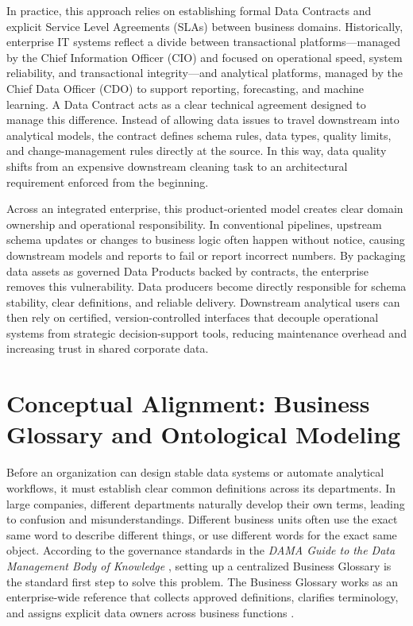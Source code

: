 In practice, this approach relies on establishing formal Data Contracts and explicit Service Level Agreements (SLAs) between business domains. 
Historically, enterprise IT systems reflect a divide between transactional platforms---managed by the Chief Information Officer (CIO) and focused on operational speed, 
system reliability, and transactional integrity---and analytical platforms, managed by the Chief Data Officer (CDO) to support reporting, forecasting, and machine learning. 
A Data Contract acts as a clear technical agreement designed to manage this difference. 
Instead of allowing data issues to travel downstream into analytical models, the contract defines schema rules, data types, quality limits, and change-management rules 
directly at the source. In this way, data quality shifts from an expensive downstream cleaning task to an architectural requirement enforced from the beginning.

Across an integrated enterprise, this product-oriented model creates clear domain ownership and operational responsibility. In conventional pipelines, 
upstream schema updates or changes to business logic often happen without notice, causing downstream models and reports to fail or report incorrect numbers. 
By packaging data assets as governed Data Products backed by contracts, the enterprise removes this vulnerability. Data producers become directly responsible for schema stability, 
clear definitions, and reliable delivery. Downstream analytical users can then rely on certified, version-controlled interfaces that decouple operational systems from strategic 
decision-support tools, reducing maintenance overhead and increasing trust in shared corporate data.


\section[Conceptual Alignment]{Conceptual Alignment: Business Glossary and Ontological Modeling}
\label{sec:business_glossary_ontology}

Before an organization can design stable data systems or automate analytical workflows, it must establish clear common definitions across its departments. 
In large companies, different departments naturally develop their own terms, leading to confusion and misunderstandings. Different business units often use the exact 
same word to describe different things, or use different words for the exact same object. 
According to the governance standards in the \textit{DAMA Guide to the Data Management Body of Knowledge} \cite{dama2024dmbok}, setting up a centralized Business Glossary 
is the standard first step to solve this problem. The Business Glossary works as an enterprise-wide reference that collects approved definitions, clarifies terminology, 
and assigns explicit data owners across business functions \cite{dama2024dmbok}.

